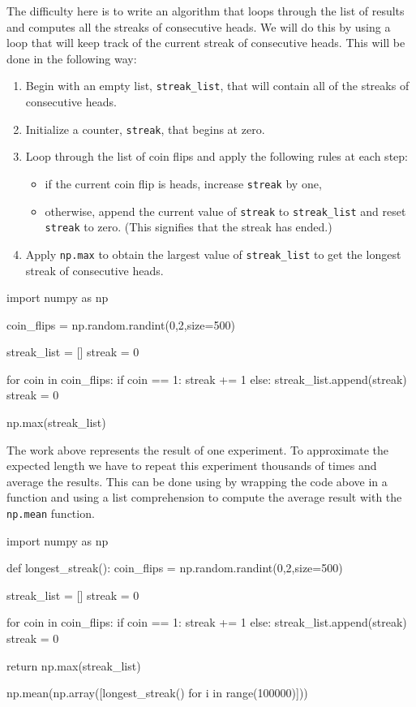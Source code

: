 \documentclass{ximera}
\begin{document}
The difficulty here is to write an algorithm that loops through the list of results and computes all the streaks of consecutive heads. We will do this by using a loop that will keep track of the current streak of consecutive heads. This will be done in the following way:
\begin{enumerate}
	\item Begin with an empty list, \verb|streak_list|, that will contain all of the streaks of consecutive heads.
	\item Initialize a counter, \verb|streak|, that begins at zero.
	\item Loop through the list of coin flips and apply the following rules at each step:
		\begin{itemize}
			\item if the current coin flip is heads, increase \verb|streak| by one,
			\item otherwise, append the current value of \verb|streak| to \verb|streak_list| and reset \verb|streak| to zero. (This signifies that the streak has ended.)
		\end{itemize}
	\item Apply \verb|np.max| to obtain the largest value of \verb|streak_list| to get the longest streak of consecutive heads.
\end{enumerate}

\begin{sageCell}
import numpy as np

coin_flips = np.random.randint(0,2,size=500)

streak_list = []
streak = 0

for coin in coin_flips:
        if coin == 1:
                streak += 1
        else:
                streak_list.append(streak)
                streak = 0

np.max(streak_list)
\end{sageCell}

The work above represents the result of one experiment. To approximate the expected length we have to repeat this experiment thousands of times and average the results. This can be done using by wrapping the code above in a function and using a list comprehension to compute the average result with the \verb|np.mean| function.

\begin{sageCell}
import numpy as np

def longest_streak():
        coin_flips = np.random.randint(0,2,size=500)

        streak_list = []
        streak = 0

        for coin in coin_flips:
                if coin == 1:
                        streak += 1
                else:
                        streak_list.append(streak)
                        streak = 0

        return np.max(streak_list)

np.mean(np.array([longest_streak() for i in range(100000)]))
\end{sageCell}
\end{document}
